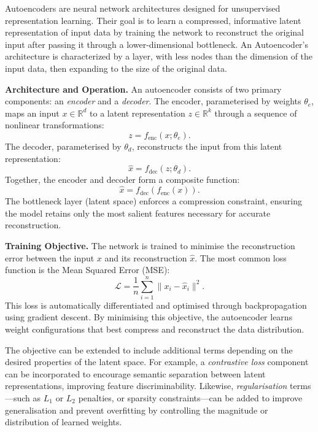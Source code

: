 Autoencoders are neural network architectures designed for unsupervised representation learning. Their goal is to learn a compressed, informative latent representation of input data by training the network to reconstruct the original input after passing it through a lower-dimensional bottleneck. An Autoencoder's architecture is characterized by a layer, with less nodes than the dimension of the input data, then expanding to the size of the original data. 

\vspace{0.5em}
\noindent
\textbf{Architecture and Operation.}
An autoencoder consists of two primary components: an \textit{encoder} and a \textit{decoder}. The encoder, parameterised by weights $\theta_e$, maps an input $x \in \mathbb{R}^d$ to a latent representation $z \in \mathbb{R}^k$ through a sequence of nonlinear transformations:
\begin{equation}
z = f_\text{enc}(x; \theta_e).
\label{eq:encoder}
\end{equation}
The decoder, parameterised by $\theta_d$, reconstructs the input from this latent representation:
\begin{equation}
\hat{x} = f_\text{dec}(z; \theta_d).
\label{eq:decoder}
\end{equation}
Together, the encoder and decoder form a composite function:
\begin{equation}
\hat{x} = f_\text{dec}(f_\text{enc}(x)).
\label{eq:composite}
\end{equation}
The bottleneck layer (latent space) enforces a compression constraint, ensuring the model retains only the most salient features necessary for accurate reconstruction.

\vspace{0.5em}
\noindent
\textbf{Training Objective.}
The network is trained to minimise the reconstruction error between the input $x$ and its reconstruction $\hat{x}$. The most common loss function is the Mean Squared Error (MSE):
\begin{equation}
\mathcal{L} = \frac{1}{n} \sum_{i=1}^{n} \| x_i - \hat{x}_i \|^2.
\label{eq:ae_mse_loss}
\end{equation}
This loss is automatically differentiated and optimised through backpropagation using gradient descent. By minimising this objective, the autoencoder learns weight configurations that best compress and reconstruct the data distribution.

The objective can be extended to include additional terms depending on the desired properties of the latent space. For example, a \textit{contrastive loss} component can be incorporated to encourage semantic separation between latent representations, improving feature discriminability. Likewise, \textit{regularisation} terms—such as $L_1$ or $L_2$ penalties, or sparsity constraints—can be added to improve generalisation and prevent overfitting by controlling the magnitude or distribution of learned weights.


